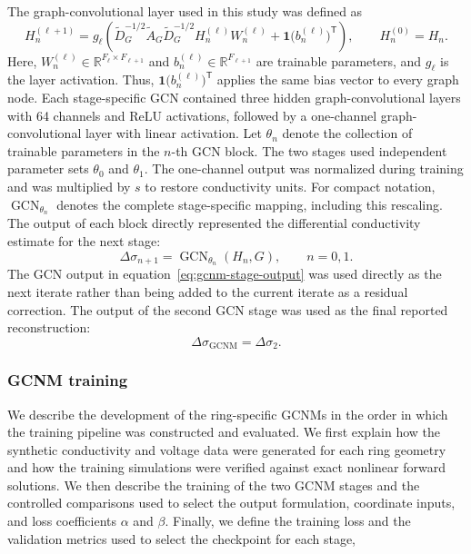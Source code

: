 \documentclass[11pt]{article}
\begin{document}
The graph-convolutional layer used in this study was defined as
\begin{equation*}
H_n^{(\ell+1)}
=
g_\ell\!\left(
\widetilde D_G^{-1/2}
\widetilde A_G
\widetilde D_G^{-1/2}
H_n^{(\ell)}
W_n^{(\ell)}
+
\mathbf{1}\bigl(b_n^{(\ell)}\bigr)^{\mathsf T}
\right),
\qquad
H_n^{(0)}=H_n.
\end{equation*}
Here, \(W_n^{(\ell)}\in\mathbb{R}^{F_\ell\times F_{\ell+1}}\) and \(b_n^{(\ell)}\in\mathbb{R}^{F_{\ell+1}}\) are trainable parameters, and \(g_\ell\) is the layer activation.
Thus, \(\mathbf{1}\bigl(b_n^{(\ell)}\bigr)^{\mathsf T}\) applies the same bias vector to every graph node.
Each stage-specific GCN contained three hidden graph-convolutional layers with 64 channels and ReLU activations, followed by a one-channel graph-convolutional layer with linear activation.
Let \(\theta_n\) denote the collection of trainable parameters in the \(n\)-th GCN block.
The two stages used independent parameter sets \(\theta_0\) and \(\theta_1\).
The one-channel output was normalized during training and was multiplied by $s$ to restore conductivity units.
For compact notation, $\operatorname{GCN}_{\theta_n}$ denotes the complete stage-specific mapping, including this rescaling.
The output of each block directly represented the differential conductivity estimate for the next stage:
\begin{equation}
    \Delta\sigma_{n+1}
    =
    \operatorname{GCN}_{\theta_n}\!\left(H_n,G\right),
    \qquad
    n=0,1.
\label{eq:gcnm-stage-output}
\end{equation}
The GCN output in equation~\eqref{eq:gcnm-stage-output} was used directly as the next iterate rather than being added to the current iterate as a residual correction.
The output of the second GCN stage was used as the final reported reconstruction:
\begin{equation*}
    \Delta\sigma_{\mathrm{GCNM}}
    =
    \Delta\sigma_2.
\end{equation*}


\subsubsection{GCNM training}
\label{sec:gcnm-training}

\begingroup

We describe the development of the ring-specific GCNMs in the order in which the training pipeline was constructed and evaluated.
We first explain how the synthetic conductivity and voltage data were generated for each ring geometry and how the training simulations were verified against exact nonlinear forward solutions.
We then describe the training of the two GCNM stages and the controlled comparisons used to select the output formulation, coordinate inputs, and loss coefficients $\alpha$ and $\beta$.
Finally, we define the training loss and the validation metrics used to select the checkpoint for each stage,
\end{document}

